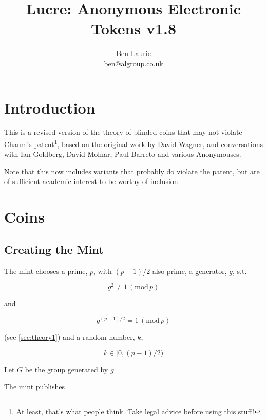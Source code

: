 \documentclass[a4paper,titlepage]{article}
\title{Lucre: Anonymous Electronic Tokens v1.8}
\author{Ben Laurie \\
ben@algroup.co.uk}
\begin{document}
\maketitle

\def\mod#1{\,(\textrm{mod}\,#1)}
\def\implies{\Rightarrow}
\def\qe#1{\begin{equation}#1\end{equation}}
\def\qearray#1{\begin{eqnarray}#1\end{eqnarray}}
\def\oneway#1{\textrm{oneway}(#1)}
\def\preoneway#1{\textrm{preoneway}(#1)}

\setlength{\parindent}{0pt}
\setlength{\parskip}{1ex plus 0.5ex minus 0.2ex}

\section{Introduction}

This is a revised version of the theory of blinded coins that may not
violate Chaum's patent\footnote{At least, that's what people
think. Take legal advice before using this stuff!}, based on the
original work by David Wagner, and conversations with Ian Goldberg,
David Molnar, Paul Barreto and various Anonymouses.

Note that this now includes variants that probably do violate the
patent, but are of sufficient academic interest to be worthy of
inclusion.

\section{Coins}

\subsection{Creating the Mint}
\label{sec:mint}

The mint chooses a prime, $p$, with $(p-1)/2$ also prime, a generator,
$g$, s.t.

\qe{\label{eq:3}g^2 \neq 1 \mod p}

and

\qe{\label{eq:1}g^{(p-1)/2} = 1 \mod p}

(see \ref{sec:theory1}) and a random number, $k$,

\qe{k \in [0,(p-1)/2)}

Let $G$ be the group generated by $g$.

The mint publishes
\end{document}
